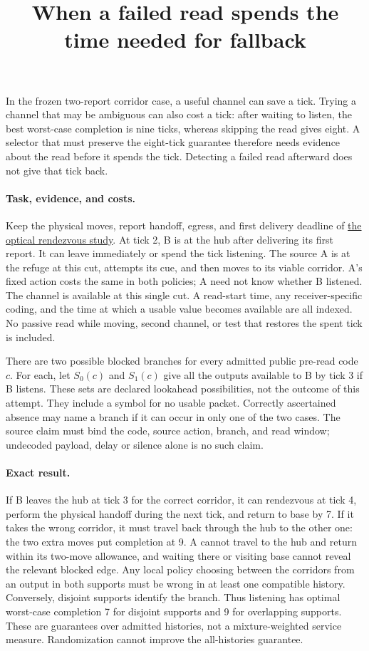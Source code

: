 \documentclass{article}
\title{When a failed read spends the time needed for fallback}
\begin{document}
\maketitle

In the frozen two-report corridor case, a useful channel can save a tick. Trying a channel that may be ambiguous can also cost a tick: after waiting to listen, the best worst-case completion is nine ticks, whereas skipping the read gives eight. A selector that must preserve the eight-tick guarantee therefore needs evidence about the read before it spends the tick. Detecting a failed read afterward does not give that tick back.

\paragraph{Task, evidence, and costs.}
Keep the physical moves, report handoff, egress, and first delivery deadline of \href{https://github.com/eternal-november/eos-research-programmes/pull/372}{the optical rendezvous study}. At tick 2, B is at the hub after delivering its first report. It can leave immediately or spend the tick listening. The source A is at the refuge at this cut, attempts its cue, and then moves to its viable corridor. A's fixed action costs the same in both policies; A need not know whether B listened. The channel is available at this single cut. A read-start time, any receiver-specific coding, and the time at which a usable value becomes available are all indexed. No passive read while moving, second channel, or test that restores the spent tick is included.

There are two possible blocked branches for every admitted public pre-read code \(c\). For each, let \(S_0(c)\) and \(S_1(c)\) give all the outputs available to B by tick 3 if B listens. These sets are declared lookahead possibilities, not the outcome of this attempt. They include a symbol for no usable packet. Correctly ascertained absence may name a branch if it can occur in only one of the two cases. The source claim must bind the code, source action, branch, and read window; undecoded payload, delay or silence alone is no such claim.

\paragraph{Exact result.}
If B leaves the hub at tick 3 for the correct corridor, it can rendezvous at tick 4, perform the physical handoff during the next tick, and return to base by 7. If it takes the wrong corridor, it must travel back through the hub to the other one: the two extra moves put completion at 9. A cannot travel to the hub and return within its two-move allowance, and waiting there or visiting base cannot reveal the relevant blocked edge. Any local policy choosing between the corridors from an output in both supports must be wrong in at least one compatible history. Conversely, disjoint supports identify the branch. Thus listening has optimal worst-case completion 7 for disjoint supports and 9 for overlapping supports. These are guarantees over admitted histories, not a mixture-weighted service measure. Randomization cannot improve the all-histories guarantee.
\end{document}
